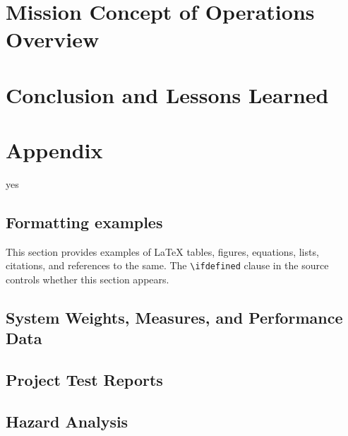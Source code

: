 \documentclass[conf]{lib/new-aiaa}
\def\WIP{yes}
\begin{document}
\section{Mission Concept of Operations Overview}

\begin{quotation}
\CONOPSDescription
\end{quotation}

\section{Conclusion and Lessons Learned}

\begin{quotation}
\ConclusionDescription
\end{quotation}

\pagebreak
\section*{Appendix}

\ifdefined\WIP
\subsection*{Formatting examples}
	This section provides examples of \LaTeX{} tables, figures, equations,
	lists, citations, and references to the same. The \verb|\ifdefined| clause
	in the source controls whether this section appears.
\fi

\subsection{System Weights, Measures, and Performance Data}

\begin{quotation}
\SystemMeasuresDescription{}
\end{quotation}

\subsection{Project Test Reports}

\begin{quotation}
\TestReportsDescription{}
\end{quotation}

\subsection{Hazard Analysis}
\end{document}
